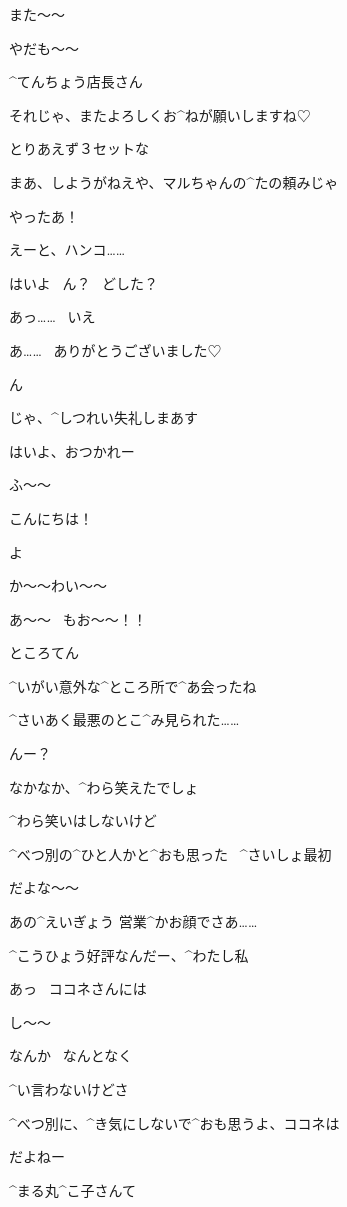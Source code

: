 \page
\Maruko また〜〜

\Maruko やだも〜〜

\Maruko ^{てんちょう}{店長}さん

\Maruko それじゃ、またよろしくお^{ねが}{願}いしますね♡

\Person とりあえず３セットな

\Person まあ、しようがねえや、マルちゃんの^{たの}{頼}みじゃ

\Maruko やったあ！

\page
\Person えーと、ハンコ……

\Person はいよ
\ ん？
\ どした？

\Maruko あっ……
\ いえ

\page
\Maruko あ……
\ ありがとうございました♡

\Person ん

\Maruko じゃ、^{しつれい}{失礼}しまあす

\Person はいよ、おつかれー

\page
\Maruko ふ〜〜

\Alpha こんにちは！

\Maruko よ

\Alpha か〜〜わい〜〜

\Maruko あ〜〜
\ もお〜〜！！

\page
\Sign ところてん

\Alpha ^{いがい}{意外}な^{ところ}{所}で^{あ}{会}ったね

\Maruko ^{さいあく}{最悪}のとこ^{み}{見}られた……

\Alpha んー？

\Maruko なかなか、^{わら}{笑}えたでしょ

\Alpha ^{わら}{笑}いはしないけど

\page
\Alpha ^{べつ}{別}の^{ひと}{人}かと^{おも}{思}った
\ ^{さいしょ}{最初}

\Maruko だよな〜〜

\Maruko あの^{えいぎょう }{営業}^{かお}{顔}でさあ……

\Maruko ^{こうひょう}{好評}なんだー、^{わたし}{私}

\page
\Maruko あっ
\ ココネさんには

\Maruko し〜〜

\Maruko なんか
\ なんとなく

\Alpha ^{い}{言}わないけどさ

\Alpha ^{べつ}{別}に、^{き}{気}にしないで^{おも}{思}うよ、ココネは

\Maruko だよねー

\page
\Alpha ^{まる}{丸}^{こ}{子}さんて

